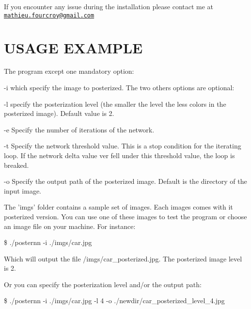 If you encounter any issue during the installation please contact me at \href{mailto:mathieu.fourcroy@gmail.com}{\tt mathieu.\-fourcroy@gmail.\-com}

\section*{U\-S\-A\-G\-E E\-X\-A\-M\-P\-L\-E }

The program except one mandatory option\-:
\begin{DoxyItemize}
\item -\/i which specify the image to posterized. The two others options are optional\-:
\item -\/l specify the posterization level (the smaller the level the less colors in the posterized image). Default value is 2.
\item -\/e Specify the number of iterations of the network.
\item -\/t Specify the network threshold value. This is a stop condition for the iterating loop. If the network delta value ver fell under this threshold value, the loop is breaked.
\item -\/o Specify the output path of the posterized image. Default is the directory of the input image.
\end{DoxyItemize}

The 'imgs' folder contains a sample set of images. Each images comes with it posterized version. You can use one of these images to test the program or choose an image file on your machine. For instance\-:

\$ ./posternn -\/i ./imgs/car.jpg

Which will output the file /imgs/car\-\_\-posterized.jpg. The posterized image level is 2.

Or you can specify the posterization level and/or the output path\-:

\$ ./posternn -\/i ./imgs/car.jpg -\/l 4 -\/o ./newdir/car\-\_\-posterized\-\_\-level\-\_\-4.jpg 